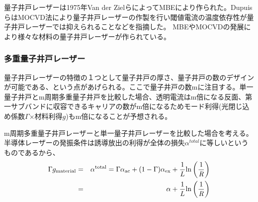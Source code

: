 量子井戸レーザーは1975年Van der ZielらによってMBEにより作られた\cite{ref_van}。DupuisらはMOCVD法により量子井戸レーザーの作製を行い閾値電流の温度依存性が量子井戸レーザーでは抑えられることなどを指摘した\cite{ref_dupuis}。%
MBEやMOCVDの発展により様々な材料の量子井戸レーザーが作られている。
\subsubsection{多重量子井戸レーザー}
量子井戸レーザーの特徴の１つとして量子井戸の厚さ、量子井戸の数のデザインが可能である、という点があげられる。ここで量子井戸の数mに注目する。単一量子井戸とm周期多重量子井戸を比較した場合、透明電流はm倍になる反面、第一サブバンドに収容できるキャリアの数がm倍になるためモード利得(光閉じ込め係数$\Gamma$×材料利得$g$)もm倍になることが予想される。

m周期多重量子井戸レーザーと単一量子井戸レーザーを比較した場合を考える。
半導体レーザーの発振条件は誘導放出の利得が全体の損失$\alpha^{total}$に等しいというものであるから、
\begin{eqnarray}
\label{eq:th}
\Gamma g_{\rm{material}}&=&\alpha^{\rm{total}}= \Gamma \alpha_{\rm{ac}} +(1-\Gamma)\alpha_{\rm{ex}}+\dfrac{1}{L}\rm{ln}\left( \dfrac{1}{\it R} \right )\\
&=& \alpha + \dfrac{1}{L}\rm{ln}\left( \dfrac{1}{\it R} \right )
\end{eqnarray}

